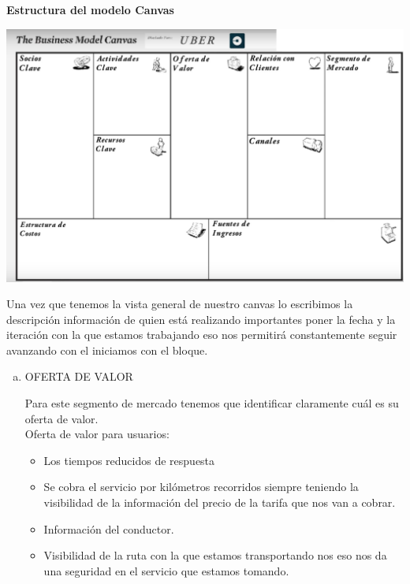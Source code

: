 \documentclass[10pt,a4paper]{article}
\begin{document}
\begin{multicols}{2}
		\textbf{Estructura del modelo Canvas}		
		\begin{center}
			\includegraphics[scale=0.30]{./Imagenes/img02}
		\end{center}
		
		Una vez que tenemos la vista general de nuestro canvas lo escribimos la descripción información de quien está realizando importantes poner la fecha y la iteración con la que estamos trabajando eso nos permitirá constantemente seguir avanzando con el iniciamos con el bloque.
				
		\begin{enumerate}[a.]
			\item OFERTA DE VALOR 
			
			Para este segmento de mercado tenemos que identificar claramente cuál es su oferta de valor.\\
			
			Oferta de valor para usuarios:
			
				\begin{itemize}
					\item Los tiempos reducidos de respuesta 
					\item Se cobra el servicio por kilómetros recorridos siempre teniendo la visibilidad de la información del precio de la tarifa que nos van a cobrar.
					\item Información del conductor.
					\item Visibilidad de la ruta con la que estamos transportando nos eso nos da una seguridad en el servicio que estamos tomando. 					
				\end{itemize}
				

\end{enumerate}
\end{multicols}
\end{document}
